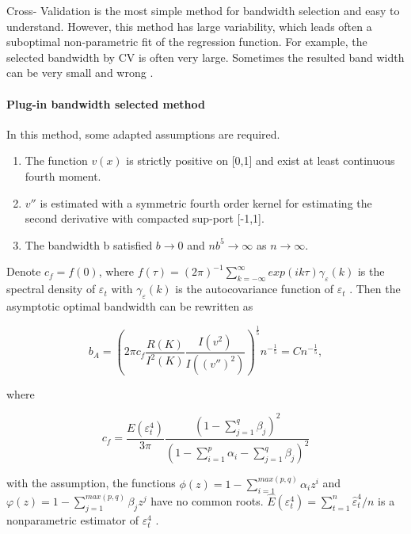 Cross- Validation is the most simple method for bandwidth selection and easy to understand. However, this method has large variability, which leads often a suboptimal non-parametric fit of the regression function. For example, the selected bandwidth by CV is often very large. Sometimes the resulted band width can be very small and wrong \cite{Altman1995}. 

\paragraph{Plug-in bandwidth selected method}

In this method, some adapted assumptions are required.


\begin{enumerate}
    \item The function $v(x)$ is strictly positive on [0,1] and exist at least continuous fourth moment.    
    \item $v''$ is estimated with a symmetric fourth order kernel for estimating the second derivative with compacted sup-port [-1,1].
    \item The bandwidth b satisfied $b \rightarrow 0$  and $nb^{5} \rightarrow \infty $  as $n \rightarrow \infty$.
\end{enumerate}

Denote $c_{f}=f(0)$, where $f(\tau)=(2\pi)^{-1}\sum_{k=-\infty}^{\infty}exp(ik\tau)\gamma_{\varepsilon}(k)$ is the spectral density of $\varepsilon_{t}$  with $\gamma_{\varepsilon}(k)$ is the autocovariance function of $\varepsilon_{t}$ . Then the asymptotic optimal bandwidth can be rewritten as 

\begin{equation}
b_{A} =(2\pi c_{f} \frac{R(K)}{I^{2}(K)}\frac{I(v^{2})}{I((v'')^2)})^{\frac{1}{5}}n^{-\frac{1}{5}} = Cn^{-\frac{1}{5}},
\end{equation}

where

\begin{equation}
c_{f}=\frac{E(\varepsilon_{t}^{4})}{3\pi}\frac{(1-\sum_{j=1}^{q}\beta_{j})^{2}}{(1-\sum_{i=1}^{p}\alpha_{i}-\sum_{j=1}^{q}\beta_{j})^{2}}
\end{equation}
 
with the assumption, the functions $\phi(z)=1-\sum_{i=1}^{max(p,q)}\alpha_{i}z^{i}$ and $\varphi(z)=1-\sum_{j=1}^{max(p,q)}\beta_{j}z^{j}$ have no common roots. $\hat{E}(\varepsilon_t^{4})=\sum_{t=1}^{n}\hat{\varepsilon}_{t}^{4}/n$ is a nonparametric estimator of $\varepsilon_{t}^{4}$ \citep{Feng2004}.


